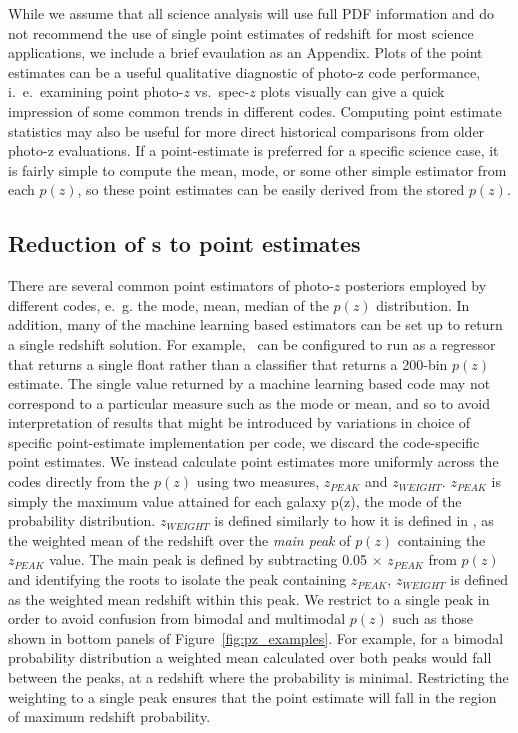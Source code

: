 While we assume that all science analysis will use full PDF information and do not recommend the use of single point estimates of redshift for most science applications, we include a brief evaulation as an Appendix.
Plots of the point estimates can be a useful qualitative diagnostic of photo-z code performance, i.~e.~examining point photo-$z$ vs.~spec-$z$ plots visually can give a quick impression of some common trends in different codes.
Computing point estimate statistics may also be useful for more direct historical comparisons from older photo-z evaluations.
If a point-estimate is preferred for a specific science case, it is fairly simple to compute the mean, mode, or some other simple estimator from each $p(z)$, so these point estimates can be easily derived from the stored $p(z)$.

\subsection{Reduction of \pzpdf s to point estimates}
\label{sec:pointest}

There are several common point estimators of photo-$z$ posteriors employed by different codes, e.~g. the mode, mean, median of the $p(z)$ distribution.
In addition, many of the machine learning based estimators can be set up to return a single redshift solution.
For example, \skynet\ can be configured to run as a regressor that returns a single float rather than a classifier that returns a 200-bin $p(z)$ estimate.
The single value returned by a machine learning based code may not correspond to a particular measure such as the mode or mean, and so to avoid interpretation of results that might be introduced by variations in choice of specific point-estimate implementation per code, we discard the code-specific point estimates.
We instead calculate point estimates more uniformly across the codes directly from the $p(z)$ using two measures, $z_{PEAK}$ and $z_{WEIGHT}$.
$z_{PEAK}$  is simply the maximum value attained for each galaxy p(z), the mode of the probability distribution.
$z_{WEIGHT}$ is defined similarly to how it is defined in \citet{Dahlen:13}, as the weighted mean of the redshift over the {\it main peak} of $p(z)$ containing the $z_{PEAK}$ value.
The main peak is defined by subtracting 0.05$\,\times\,z_{PEAK}$ from $p(z)$ and identifying the roots to isolate the peak containing $z_{PEAK}$, $z_{WEIGHT}$ is defined as the weighted mean redshift within this peak.
We restrict to a single peak in order to avoid confusion from bimodal and multimodal $p(z)$ such as those shown in bottom panels of Figure~\ref{fig:pz_examples}.
For example, for a bimodal probability distribution a weighted mean calculated over both peaks would fall between the peaks, at a redshift where the probability is minimal.
Restricting the weighting to a single peak ensures that the point estimate will fall in the region of maximum redshift probability.
%
